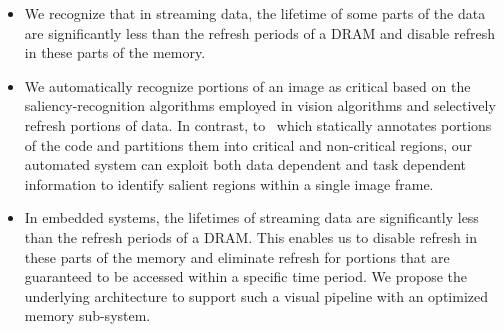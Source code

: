 \begin{itemize}[leftmargin=*]
\item We recognize that in streaming data, the lifetime of some parts of the data are significantly less than the refresh periods of a DRAM and disable refresh in these parts of the memory. 
\item We automatically recognize portions of an image as critical based on the saliency-recognition algorithms employed in vision algorithms and selectively refresh portions of data.
In contrast, to~\cite{Liu2011} which statically annotates portions of the code and partitions them into critical and non-critical regions, our automated system can exploit both data dependent and task dependent information to identify salient regions within a single image frame. 
\item In embedded systems, the lifetimes of streaming data are significantly less than the refresh periods of a DRAM. This enables us to disable refresh in these parts of the memory and eliminate refresh for portions that are guaranteed to be accessed within a specific time period. We propose the underlying architecture to support such a visual pipeline with an optimized memory sub-system.
\end{itemize}


